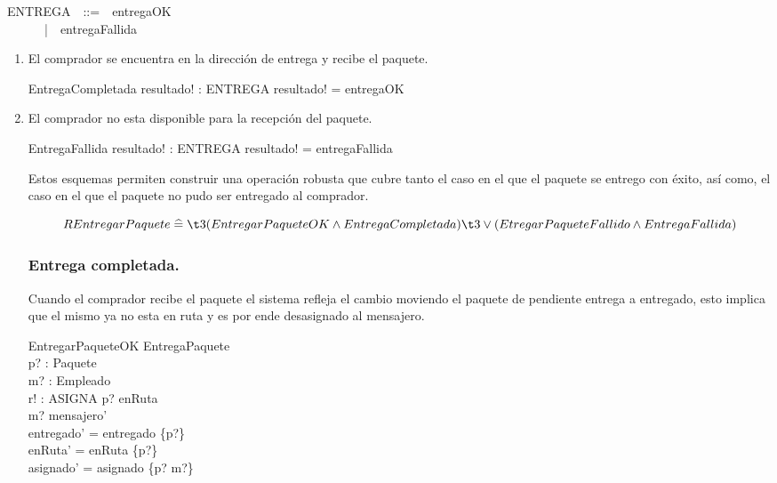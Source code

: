 \documentclass[12pt,a4paper]{article}
\renewcommand*{\defs}{\mathrel{\widehat{=}}}
\begin{document}
\begin{zed}
ENTREGA~~::=~~entregaOK\\
~~~~~~|~~entregaFallida
\end{zed}

\begin{enumerate}
\item El comprador se encuentra en la dirección de entrega y recibe el paquete.

\begin{schema}{EntregaCompletada}
resultado! : ENTREGA
\where
resultado! = entregaOK
\end{schema}

\item El comprador no esta disponible para la recepción del paquete.

\begin{schema}{EntregaFallida}
resultado! : ENTREGA
\where
resultado! = entregaFallida
\end{schema}

Estos esquemas permiten construir una operación robusta que cubre tanto el caso en el que el paquete se entrego con éxito, así como, el caso en el que el paquete no pudo ser entregado al comprador.

\[ REntregarPaquete \defs\\ 
\t3 (EntregarPaqueteOK \wedge EntregaCompletada)\\ 
\t3 \lor (EtregarPaqueteFallido \wedge EntregaFallida) \]

\newpage
\subsubsection*{Entrega completada.}
Cuando el comprador recibe el paquete el sistema refleja el cambio moviendo el paquete de pendiente entrega a entregado, esto implica que el mismo ya no esta en ruta y es por ende desasignado al mensajero.

\begin{schema}{EntregarPaqueteOK}
\Delta EntregaPaquete\\
p? : Paquete\\
m? : Empleado\\
r! : ASIGNA
\where
p? \notin  enRuta\\
m? \in mensajero'\\
entregado' = entregado \cup \{p?\}\\
enRuta' = enRuta \setminus \{p?\}\\
asignado' = asignado \setminus \{p? \mapsto m?\}
\end{schema}


\end{enumerate}
\end{document}
